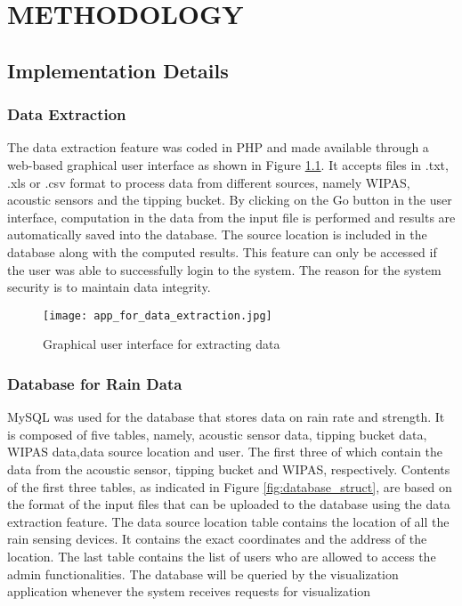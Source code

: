 \chapter{METHODOLOGY}
\section{Implementation Details}

\subsection{Data Extraction}
The data extraction feature was coded in PHP and made available through a web-based graphical user interface as shown in Figure \ref{fig:data_extraction}. It accepts files in .txt, .xls or .csv format to process data from different sources, namely WIPAS, acoustic sensors and the tipping bucket. By clicking on the Go button in the user interface, computation in the data from the input file is performed and results are automatically saved into the database. The source location is included in the database along with the computed results. This feature can only be accessed if the user was able to successfully login to the system. The reason for the system security is to maintain data integrity.

\begin{figure}
    \centering
        \texttt{[image: app\_for\_data\_extraction.jpg]}
    \caption{Graphical user interface for extracting data}
    \label{fig:data_extraction}
\end{figure}

\subsection{Database for Rain Data}
MySQL was used for the database that stores data on rain rate and strength. It is composed of five tables, namely, acoustic sensor data, tipping bucket data, WIPAS data,data source location and user. The first three of which contain the data from the acoustic sensor, tipping bucket and WIPAS, respectively. Contents of the first three tables, as indicated in Figure \ref{fig:database_struct}, are based on the format of the input files that can be uploaded to the database using the data extraction feature. The data source location table contains the location of all the rain sensing devices. It contains the exact coordinates and the address of the location. The last table contains the list of users who are allowed to access the admin functionalities. The database will be queried by the visualization application whenever the system receives requests for visualization

